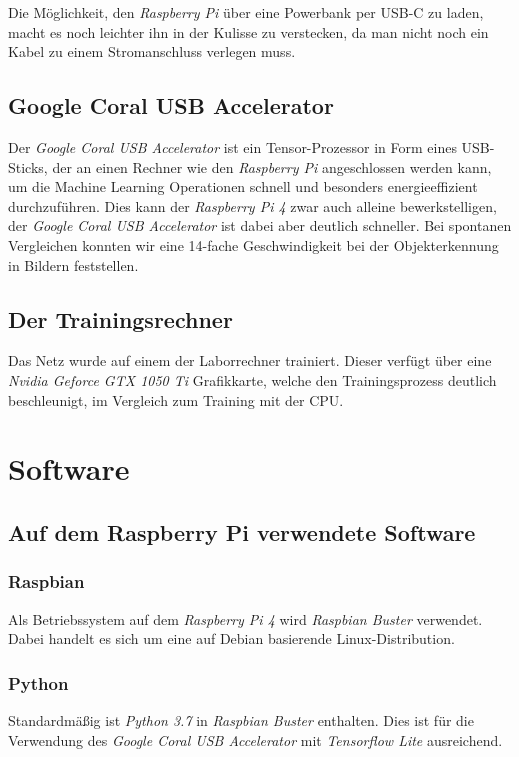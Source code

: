 \documentclass[a4paper, 12pt]{scrartcl}
\begin{document}
		Die Möglichkeit, den \emph{Raspberry Pi} über eine Powerbank per USB-C zu laden, macht es noch leichter ihn in der Kulisse zu verstecken, da man nicht noch ein Kabel zu einem Stromanschluss verlegen muss.
		
		
		\subsection{Google Coral USB Accelerator}
		Der \emph{Google Coral USB Accelerator} ist ein Tensor-Prozessor in Form eines USB-Sticks, der an einen Rechner wie den \emph{Raspberry Pi} angeschlossen werden kann, um die Machine Learning Operationen schnell und besonders energieeffizient durchzuführen. Dies kann der \emph{Raspberry Pi 4} zwar auch alleine bewerkstelligen, der \emph{Google Coral USB Accelerator} ist dabei aber deutlich schneller. Bei spontanen Vergleichen konnten wir eine 14-fache Geschwindigkeit bei der Objekterkennung in Bildern feststellen.

	
		\subsection{Der Trainingsrechner}
		Das Netz wurde auf einem der Laborrechner trainiert. Dieser verfügt über eine \emph{Nvidia Geforce GTX 1050 Ti} Grafikkarte, welche den Trainingsprozess deutlich beschleunigt, im Vergleich zum Training mit der CPU.	
	
	\section{Software}
		\subsection{Auf dem Raspberry Pi verwendete Software}
			\subsubsection{Raspbian}
			Als Betriebssystem auf dem \emph{Raspberry Pi 4} wird \emph{Raspbian Buster} verwendet. Dabei handelt es sich um eine auf Debian basierende Linux-Distribution.
			
			
			\subsubsection{Python}
			Standardmäßig ist \emph{Python 3.7} in \emph{Raspbian Buster} enthalten. Dies ist für die Verwendung des \emph{Google Coral USB Accelerator} mit \emph{Tensorflow Lite} ausreichend.
			
\end{document}
